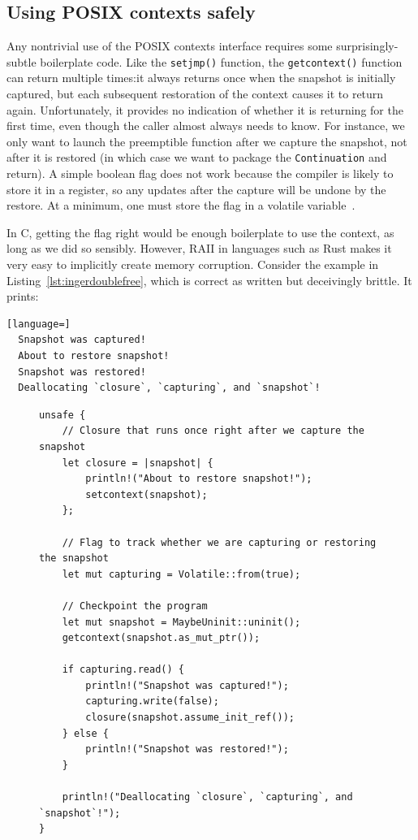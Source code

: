 \subsection{Using POSIX contexts safely}
\label{sec:libinger:boilerplate}

Any nontrivial use of the POSIX contexts interface requires some surprisingly-subtle
boilerplate code.  Like the \texttt{setjmp()} function, the
\texttt{getcontext()} function can return multiple times:\@ it always returns once
when the snapshot is initially captured, but each subsequent restoration of the
context causes it to return again.  Unfortunately, it provides no indication of
whether it is returning for the first time, even though the caller almost always
needs to know.  For instance, we only want to launch the preemptible function after
we capture the snapshot, not after it is restored (in which case we want to package
the \texttt{Continuation} and return).  A simple boolean flag does not work because
the compiler is likely to store it in a register, so any updates after the capture
will be undone by the restore.  At a minimum, one must store the flag in a volatile
variable~\cite{getcontext-manpage}.

In C, getting the flag right would be enough boilerplate to use the context, as long
as we did so sensibly.  However, RAII in languages such as Rust makes it very easy to
implicitly create memory corruption.  Consider the example in
Listing~\ref{lst:ingerdoublefree}, which is correct as written but deceivingly
brittle.  It prints:
\begin{lstlisting}[language=]
  Snapshot was captured!
  About to restore snapshot!
  Snapshot was restored!
  Deallocating `closure`, `capturing`, and `snapshot`!
\end{lstlisting}

\begin{figure}
\begin{lstlisting}[label=lst:ingerdoublefree,caption=Subtly unsound use of POSIX contexts from Rust,morekeywords={let,mut,unsafe}]
unsafe {
	// Closure that runs once right after we capture the snapshot
	let closure = |snapshot| {
		println!("About to restore snapshot!");
		setcontext(snapshot);
	};

	// Flag to track whether we are capturing or restoring the snapshot
	let mut capturing = Volatile::from(true);

	// Checkpoint the program
	let mut snapshot = MaybeUninit::uninit();
	getcontext(snapshot.as_mut_ptr());

	if capturing.read() {
		println!("Snapshot was captured!");
		capturing.write(false);
		closure(snapshot.assume_init_ref());
	} else {
		println!("Snapshot was restored!");
	}

	println!("Deallocating `closure`, `capturing`, and `snapshot`!");
}
\end{lstlisting}
\end{figure}

